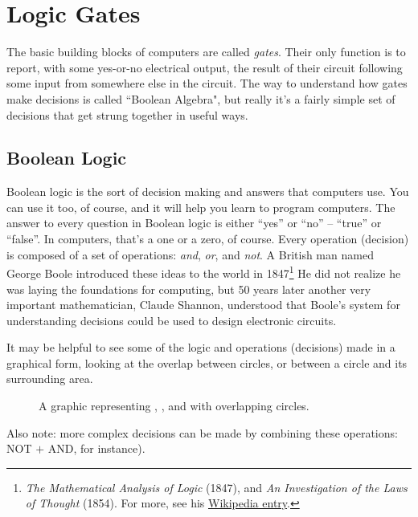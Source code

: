 \section{Logic Gates}

The basic building blocks of computers are called \emph{gates}. Their only function is to report, with some yes-or-no electrical output, the result of their circuit following some input from somewhere else in the circuit. The way to understand how gates make decisions is called ``Boolean Algebra", but really it's a fairly simple set of decisions that get strung together in useful ways.

\subsection*{Boolean Logic}

Boolean logic is the sort of decision making and answers that computers use. You can use it too, of course, and it will help you learn to program computers. The answer to every question in Boolean logic is either ``yes'' or ``no'' -- ``true'' or ``false''. In computers, that's a one or a zero, of course.   Every operation (decision) is composed of a set of operations: \emph{and}, \emph{or}, and \emph{not}. A British man named George Boole introduced these ideas to the world in 1847\footnote{\emph{The Mathematical Analysis of Logic} (1847), and \emph{An Investigation of the Laws of Thought} (1854). For more, see his {\color{webblue}\href{https://en.wikipedia.org/wiki/George_Boole}{Wikipedia entry}}.} He did not realize he was laying the foundations for computing, but 50 years later another very important mathematician, Claude Shannon, understood that Boole's system for understanding decisions could be used to design electronic circuits. 

It may be helpful to see some of the logic and operations (decisions) made in a graphical form, looking at the overlap between circles, or between a circle and its surrounding area.

\begin{figure}[h!]
\begin{center}

\caption{A graphic representing {}, {}, and {} with overlapping circles.}
\end{center}
\end{figure}


Also note: more complex decisions can be made by combining these operations: NOT $+$ AND, for instance). 


